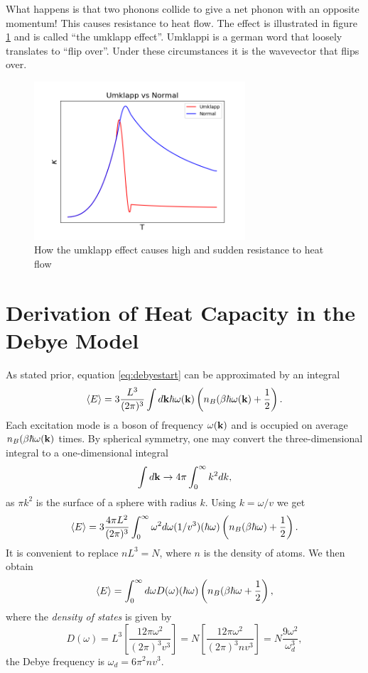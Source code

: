 \documentclass[11pt]{amsart}
\begin{document}
What happens is that two phonons collide to give a net phonon with an opposite momentum! This causes resistance to heat flow. The effect is illustrated in figure \ref{fig:umklapp} and is called ``the umklapp effect''. Umklappi is a german word that loosely translates to ``flip over''. Under these circumstances it is the wavevector that flips over.

\begin{figure}[h]
\centering
	\includegraphics[width= 0.7\textwidth]{umklapp.png}
	\caption{How the umklapp effect causes high and sudden resistance to heat flow}
	\label{fig:umklapp}
\end{figure}

\section{Derivation of Heat Capacity in the Debye Model}
As stated prior, equation \ref{eq:debyestart} can be approximated by an integral
\begin{equation}
\ev{E} = 3\frac{L^3}{(2\pi)^3}\int d\vb{k}\hbar\omega(\vb{k}) \left(n_B(\beta\hbar\omega(\vb{k})+\frac{1}{2} \right).
\end{equation}
Each excitation mode is a boson of frequency $\omega(\vb{k})$ and is occupied on average $n_B(\beta\hbar\omega(\vb{k})$ times. By spherical symmetry, one may convert the three-dimensional integral to a one-dimensional integral
\begin{equation*}
\int d\vb{k} \to 4\pi\int^\infty_0 k^2dk,
\end{equation*}
as $\pi k^2$ is the surface of a sphere with radius $k$. Using $k=\omega/v$ we get
\begin{equation}
\ev{E} = 3\frac{4\pi L^2}{(2\pi)^3}\int_0^\infty \omega^2d\omega (1/v^3)(\hbar\omega)\left( n_B(\beta\hbar\omega) + \frac{1}{2}\right).
\end{equation}
It is convenient to replace $nL^3=N$, where $n$ is the density of atoms. We then obtain
\begin{equation}
\label{eq:debye3}
\ev{E}= \int_0^\infty d\omega D(\omega)(\hbar\omega)\left(n_B(\beta\hbar\omega + \frac{1}{2} \right),
\end{equation}
where the \emph{density of states} is given by
\begin{equation}
D(\omega) 	= L^3\left[\frac{12\pi\omega^2}{(2\pi)^3v^3} \right] 
			= N\left[\frac{12\pi\omega^2}{(2\pi)^3nv^3} \right] = N\frac{9\omega^2}{\omega_d^3},
\end{equation}
the Debye frequency is $\omega_d = 6\pi^2nv^3$. 
\end{document}

